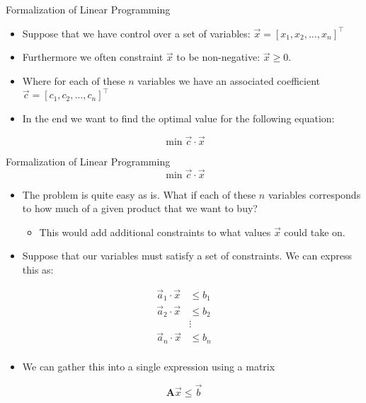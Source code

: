 \documentclass[
	11pt, %
]{beamer}
\begin{document}
\begin{frame}[label={sec:org7e6dba1}]{Formalization of Linear Programming}
\begin{itemize}
\item Suppose that we have control over a set of variables: \(\vec{x} = [x_1, x_2, \ldots, x_n]^\top\)
\pause
\item Furthermore we often constraint \(\vec{x}\) to be non-negative: \(\vec{x} \geq 0\).
\end{itemize}
\pause
\begin{itemize}
\item Where for each of these \(n\) variables we have an associated coefficient \(\vec{c} = [c_1, c_2, \ldots, c_n]^\top\)
\end{itemize}
\pause
\begin{itemize}
\item In the end we want to find the optimal value for the following equation:
\end{itemize}
\[
\min \vec{c} \cdot \vec{x}
\]
\end{frame}
\begin{frame}[label={sec:orgc3775a6}]{Formalization of Linear Programming}
\vspace{-1em}
\[ \min \vec{c} \cdot \vec{x} \]
\vspace{-1em}
\begin{itemize}
\item The problem is quite easy as is. What if each of these \(n\) variables
corresponds to how much of a given product that we want to buy?
\begin{itemize}
\item This would add additional constraints to what values \(\vec{x}\) could
take on.
\end{itemize}
\end{itemize}
\pause
\begin{itemize}
\item Suppose that our variables must satisfy a set of constraints. We can express this as:
\end{itemize}
\vspace{-2em}
\begin{align*}
\vec{a}_1 \cdot \vec{x} &\leq b_1 \\
\vec{a}_2 \cdot \vec{x} &\leq b_2 \\
& \vdots  \\
\vec{a}_n \cdot \vec{x} &\leq b_n \\
\end{align*}
\vspace{-3.5em}
\pause
\begin{itemize}
\item We can gather this into a single expression using a matrix
\end{itemize}
\[
\mathbf{A} \vec{x} \leq \vec{b}
\]
\pause
\vspace{-2em}
\end{frame}
\end{document}
